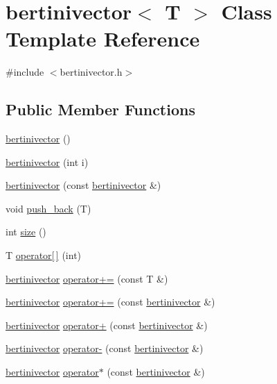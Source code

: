 \hypertarget{classbertinivector}{\section{bertinivector$<$ T $>$ Class Template Reference}
\label{classbertinivector}
}


{\ttfamily \#include $<$bertinivector.\+h$>$}

\subsection*{Public Member Functions}
\begin{DoxyCompactItemize}
\item 
\hyperlink{classbertinivector_a4e4d4646946cecd0d131151ea63bf4b3}{bertinivector} ()
\item 
\hyperlink{classbertinivector_afc27cef039c8901c7df12256b836f7ba}{bertinivector} (int i)
\item 
\hyperlink{classbertinivector_a60b237a859adc1a28b22e9fe9575c9e9}{bertinivector} (const \hyperlink{classbertinivector}{bertinivector} \&)
\item 
void \hyperlink{classbertinivector_add1d276c73126f5c3742a79baddda86e}{push\+\_\+back} (T)
\item 
int \hyperlink{classbertinivector_a2b9a646cf9fca4ad7174503d8f5212b7}{size} ()
\item 
T \hyperlink{classbertinivector_abc1f1760611307c8d3e8f821a5b9e6b9}{operator\mbox{[}$\,$\mbox{]}} (int)
\item 
\hyperlink{classbertinivector}{bertinivector} \hyperlink{classbertinivector_a11a60de57c2abd4cbfdcf6b1a878299c}{operator+=} (const T \&)
\item 
\hyperlink{classbertinivector}{bertinivector} \hyperlink{classbertinivector_a74d1c6e0f5db23fc938f067fd272fd5e}{operator+=} (const \hyperlink{classbertinivector}{bertinivector} \&)
\item 
\hyperlink{classbertinivector}{bertinivector} \hyperlink{classbertinivector_af8619aadc7a501813553c26e3bd661e0}{operator+} (const \hyperlink{classbertinivector}{bertinivector} \&)
\item 
\hyperlink{classbertinivector}{bertinivector} \hyperlink{classbertinivector_afc122f5a018555b8666c214785b90471}{operator-\/} (const \hyperlink{classbertinivector}{bertinivector} \&)
\item 
\hyperlink{classbertinivector}{bertinivector} \hyperlink{classbertinivector_a2269c44a9db2d5cc758b4f4831488488}{operator$\ast$} (const \hyperlink{classbertinivector}{bertinivector} \&)

\end{DoxyCompactItemize}
